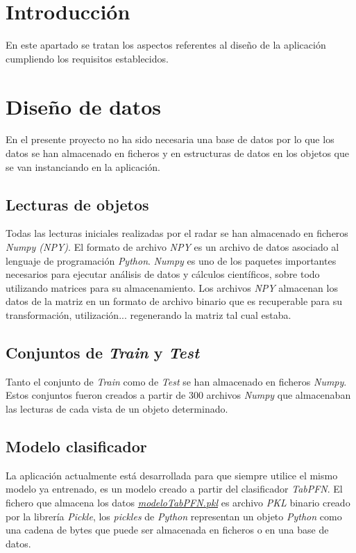 
\section{Introducción}

En este apartado se tratan los aspectos referentes al diseño de la aplicación cumpliendo los requisitos establecidos.

\section{Diseño de datos}

En el presente proyecto no ha sido necesaria una base de datos por lo que los datos se han almacenado en ficheros y en estructuras de datos en los objetos que se van instanciando en la aplicación.

\subsection{Lecturas de objetos}

Todas las lecturas iniciales realizadas por el radar se han almacenado en ficheros \textit{Numpy (NPY)}. El formato de archivo \textit{NPY} es un archivo de datos asociado al lenguaje de programación \textit{Python}. \textit{Numpy} es uno de los paquetes importantes necesarios para ejecutar análisis de datos y cálculos científicos, sobre todo utilizando matrices para su almacenamiento. Los archivos \textit{NPY} almacenan los datos de la matriz en un formato de archivo binario que es recuperable para su transformación, utilización... regenerando la matriz tal cual estaba.

\subsection{Conjuntos de \textit{Train} y \textit{Test}}

Tanto el conjunto de \textit{Train} como de \textit{Test} se han almacenado en ficheros \textit{Numpy}. Estos conjuntos fueron creados a partir de 300 archivos \textit{Numpy} que almacenaban las lecturas de cada vista de un objeto determinado.

\subsection{Modelo clasificador}

La aplicación actualmente está desarrollada para que siempre utilice el mismo modelo ya entrenado, es un modelo creado a partir del clasificador \textit{TabPFN}. El fichero que almacena los datos \href{https://github.com/mecyc/TFG_RADAR_60GHZ/blob/main/modeloTabPFN.pkl}{\textit{modeloTabPFN.pkl}} es archivo \textit{PKL} binario creado por la librería \textit{Pickle}, los \textit{pickles} de \textit{Python} representan un objeto \textit{Python} como una cadena de bytes que puede ser almacenada en ficheros o en una base de datos.

